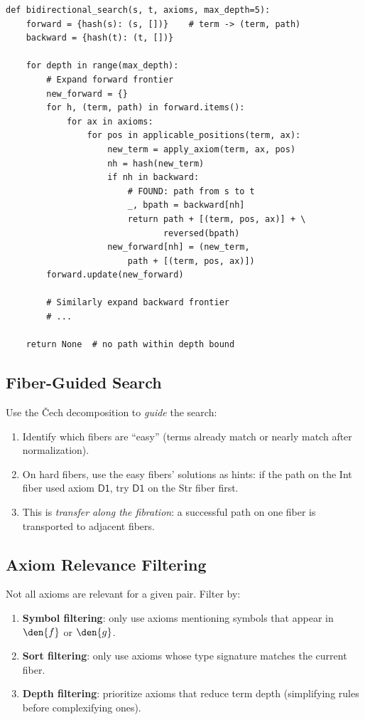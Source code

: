 \begin{lstlisting}[caption={Bidirectional path search}]
def bidirectional_search(s, t, axioms, max_depth=5):
    forward = {hash(s): (s, [])}    # term -> (term, path)
    backward = {hash(t): (t, [])}

    for depth in range(max_depth):
        # Expand forward frontier
        new_forward = {}
        for h, (term, path) in forward.items():
            for ax in axioms:
                for pos in applicable_positions(term, ax):
                    new_term = apply_axiom(term, ax, pos)
                    nh = hash(new_term)
                    if nh in backward:
                        # FOUND: path from s to t
                        _, bpath = backward[nh]
                        return path + [(term, pos, ax)] + \
                               reversed(bpath)
                    new_forward[nh] = (new_term,
                        path + [(term, pos, ax)])
        forward.update(new_forward)

        # Similarly expand backward frontier
        # ...

    return None  # no path within depth bound
\end{lstlisting}

\subsection{Fiber-Guided Search}

Use the \v{C}ech decomposition to \emph{guide} the search:
\begin{enumerate}
  \item Identify which fibers are ``easy'' (terms already match or
    nearly match after normalization).
  \item On hard fibers, use the easy fibers' solutions as hints:
    if the path on the Int fiber used axiom $\mathsf{D1}$, try
    $\mathsf{D1}$ on the Str fiber first.
  \item This is \emph{transfer along the fibration}: a successful
    path on one fiber is transported to adjacent fibers.
\end{enumerate}

\subsection{Axiom Relevance Filtering}

Not all axioms are relevant for a given pair.  Filter by:
\begin{enumerate}
  \item \textbf{Symbol filtering}: only use axioms mentioning
    symbols that appear in $\den{f}$ or $\den{g}$.
  \item \textbf{Sort filtering}: only use axioms whose type
    signature matches the current fiber.
  \item \textbf{Depth filtering}: prioritize axioms that reduce
    term depth (simplifying rules before complexifying ones).
\end{enumerate}


